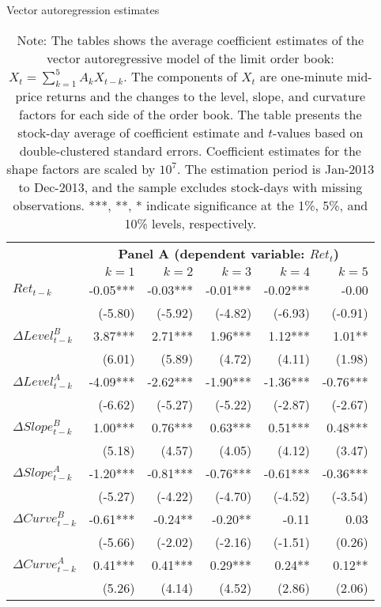 \begin{table}[t]
\small
\linespread{1}
\centering
\captionsetup{labelsep=colon, font=footnotesize, justification=centerfirst, width=\linewidth}
\caption{Vector autoregression estimates}
\label{tab:var}
\begin{tabular}{lrrrrr}
\toprule
& \multicolumn{5}{c}{\textbf{Panel A (dependent variable: $Ret_t$)}} \\
\cmidrule(l{2pt}r{2pt}){2-6}
& $k=1$ & $k=2$ & $k=3$ & $k=4$ & $k=5$ \\
\midrule
$Ret_{t-k}$ 			& -0.05*** & -0.03*** & -0.01*** & -0.02*** & -0.00 \\
						& (-5.80) & (-5.92) & (-4.82) & (-6.93) & (-0.91) \\
$\Delta Level^B_{t-k}$ 	& 3.87*** & 2.71*** & 1.96*** & 1.12*** & 1.01** \\ %
						& (6.01) & (5.89) & (4.72) & (4.11) & (1.98) \\
$\Delta Level^A_{t-k}$ 	& -4.09*** & -2.62*** & -1.90*** & -1.36*** & -0.76*** \\ %
						& (-6.62) & (-5.27) & (-5.22) & (-2.87) & (-2.67) \\
$\Delta Slope^B_{t-k}$	& 1.00*** & 0.76*** & 0.63*** & 0.51*** & 0.48*** \\ %
						& (5.18) & (4.57) & (4.05) & (4.12) & (3.47) \\
$\Delta Slope^A_{t-k}$ 	& -1.20*** & -0.81*** & -0.76*** & -0.61*** & -0.36*** \\ %
						& (-5.27) & (-4.22) & (-4.70) & (-4.52) & (-3.54) \\
$\Delta Curve^B_{t-k}$ 	& -0.61*** & -0.24** & -0.20** & -0.11 & 0.03 \\ %
						& (-5.66) & (-2.02) & (-2.16) & (-1.51) & (0.26) \\
$\Delta Curve^A_{t-k}$ 	& 0.41*** & 0.41*** & 0.29*** & 0.24** & 0.12** \\ %
						& (5.26) & (4.14) & (4.52) & (2.86) & (2.06) \\
\bottomrule
\end{tabular}
\captionsetup{position=below, font=footnotesize, justification=justified, width=0.75\linewidth}
\caption*{Note: The tables shows the average coefficient estimates of the vector autoregressive model of the limit order book: $X_t = \sum_{k=1}^{5} A_{k} X_{t-k}.$ The components of $X_t$ are one-minute mid-price returns and the changes to the level, slope, and curvature factors for each side of the order book. The table presents the stock-day average of coefficient estimate and $t$-values based on double-clustered standard errors. Coefficient estimates for the shape factors are scaled by $10^7$. The estimation period is Jan-2013 to Dec-2013, and the sample excludes stock-days with missing observations. ***, **, * indicate significance at the 1\%, 5\%, and 10\% levels, respectively.}
\end{table}


